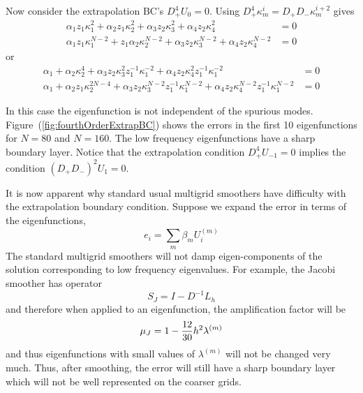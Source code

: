 Now consider the extrapolation BC's $D_+^4 U_0=0$. Using $D_+^4\kappa_m^i = D_+D_-\kappa_m^{i+2}$ gives
\begin{align}
  \alpha_1 z_1 \kappa_1^2 + \alpha_2 z_1 \kappa_2^2
                    + \alpha_3 z_2\kappa_3^{2} + \alpha_4 z_2\kappa_4^{2} &= 0  \label{eq:eiv3}\\
  \alpha_1 z_1\kappa_1^{N-2} + z_1\alpha_2\kappa_2^{N-2} 
                    + \alpha_3 z_2\kappa_3^{N-2} + \alpha_4 z_2\kappa_4^{N-2} &= 0 \label{eq:eiv4}
\end{align}
or
\begin{align}
  \alpha_1  + \alpha_2 \kappa_2^4 + \alpha_3 z_2\kappa_3^{2}z_1^{-1}\kappa_1^{-2}
                 + \alpha_4 z_2\kappa_4^{2}z_1^{-1}\kappa_1^{-2} &= 0  \label{eq:eiv3}\\
  \alpha_1  + \alpha_2 z_1\kappa_2^{2N-4} 
                 + \alpha_3 z_2\kappa_3^{N-2}z_1^{-1}\kappa_1^{N-2} 
                 + \alpha_4 z_2\kappa_4^{N-2}z_1^{-1}\kappa_1^{N-2}  &= 0 \label{eq:eiv4}
\end{align}

In this case the eigenfunction is not independent of the spurious modes. Figure~(\ref{fig:fourthOrderExtrapBC}) shows 
the errors in the first 10 eigenfunctions for $N=80$ and $N=160$. The low frequency eigenfunctions have a
sharp boundary layer. 
Notice that the extrapolation condition $D_+^4 U_{-1} =0$ implies the condition $(D_+D_-)^2 U_1=0$. 


 It is now apparent why standard usual multigrid  smoothers
have difficulty with the extrapolation boundary condition. Suppose we expand the error in terms of the eigenfunctions,
\[
      e_i = \sum_m \beta_m U^{(m)}_i 
\]
The standard multigrid smoothers will not damp eigen-components
of the solution corresponding to low frequency eigenvalues. For example, the Jacobi smoother has operator
\[
       S_J =  I - D^{-1} L_h
\]
and therefore when applied to an eigenfunction, the amplification factor will be
\[
       \mu_J =  1 - {12\over30} h^2 \lambda^{(m)}
\]
and thus eigenfunctions with small values of $\lambda^{(m)}$ will not be changed very much.
Thus, after smoothing, the error will still have
a sharp boundary layer which will not be well represented on the coarser grids.

